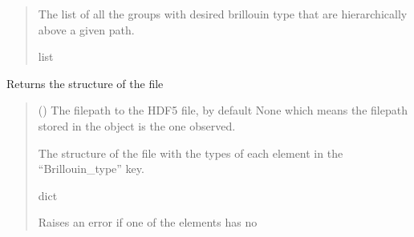 \documentclass[letterpaper,10pt,english]{sphinxmanual}
\begin{document}
\begin{fulllineitems}
\begin{fulllineitems}
\begin{quote}
\begin{description}
\begin{itemize}
\end{itemize}

\sphinxAtStartPar
The list of all the groups with desired brillouin type that are hierarchically above a given path.

\sphinxAtStartPar
list

\end{description}\end{quote}

\end{fulllineitems}


\begin{fulllineitems}
\label{\detokenize{source/HDF5_BLS:HDF5_BLS.wrapper.Wrapper.get_structure}}
\pysigstartsignatures
\pysiglinewithargsret
{}
{}
{}
\pysigstopsignatures
\sphinxAtStartPar
Returns the structure of the file
\begin{quote}\begin{description}
\sphinxAtStartPar
{} (\sphinxstyleliteralemphasis{\sphinxupquote{, }}) \textendash{} The filepath to the HDF5 file, by default None which means the filepath stored in the object is the one observed.

\sphinxAtStartPar
The structure of the file with the types of each element in the “Brillouin\_type” key.

\sphinxAtStartPar
dict

\sphinxAtStartPar
{\hyperref[\detokenize{source/HDF5_BLS:HDF5_BLS.WrapperError.WrapperError_StructureError}]{}} \textendash{} Raises an error if one of the elements has no

\end{description}\end{quote}

\end{fulllineitems}



\end{fulllineitems}
\end{document}
